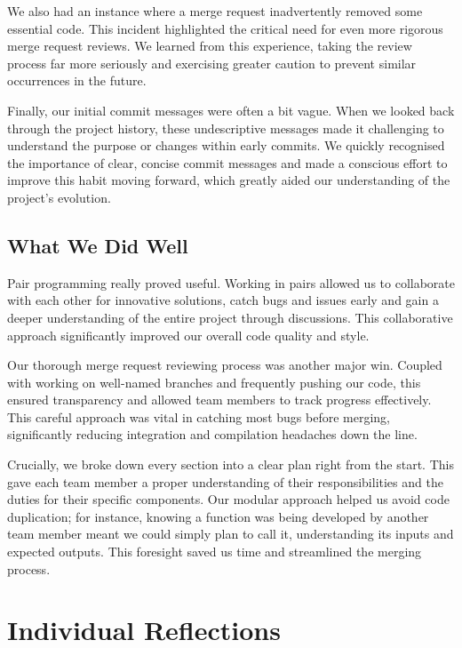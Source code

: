 \documentclass[11pt]{article}
\begin{document}
We also had an instance where a merge request inadvertently removed some essential code. This incident highlighted the critical need for even more rigorous merge request reviews. We learned from this experience, taking the review process far more seriously and exercising greater caution to prevent similar occurrences in the future.

Finally, our initial commit messages were often a bit vague. When we looked back through the project history, these undescriptive messages made it challenging to understand the purpose or changes within early commits. We quickly recognised the importance of clear, concise commit messages and made a conscious effort to improve this habit moving forward, which greatly aided our understanding of the project's evolution.    

\subsection{What We Did Well}

Pair programming really proved useful. Working in pairs allowed us to collaborate with each other for innovative solutions, catch bugs and issues early and gain a deeper understanding of the entire project through discussions. This collaborative approach significantly improved our overall code quality and style.

Our thorough merge request reviewing process was another major win. Coupled with working on well-named branches and frequently pushing our code, this ensured transparency and allowed team members to track progress effectively. This careful approach was vital in catching most bugs before merging, significantly reducing integration and compilation headaches down the line.

Crucially, we broke down every section into a clear plan right from the start. This gave each team member a proper understanding of their responsibilities and the duties for their specific components. Our modular approach helped us avoid code duplication; for instance, knowing a function was being developed by another team member meant we could simply plan to call it, understanding its inputs and expected outputs. This foresight saved us time and streamlined the merging process.

\section{Individual Reflections}
\end{document}
